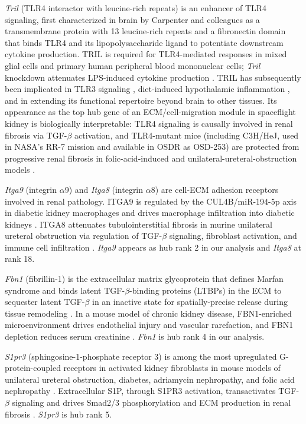 \documentclass[11pt]{article}
\newcommand{\gene}[1]{\textit{#1}}
\begin{document}
\emph{\gene{Tril}} (TLR4 interactor with leucine-rich repeats) is an enhancer of TLR4 signaling, first characterized in brain by Carpenter and colleagues \citep{carpenter2009tril} as a transmembrane protein with 13 leucine-rich repeats and a fibronectin domain that binds TLR4 and its lipopolysaccharide ligand to potentiate downstream cytokine production. TRIL is required for TLR4-mediated responses in mixed glial cells and primary human peripheral blood mononuclear cells; \gene{Tril} knockdown attenuates LPS-induced cytokine production \citep{carpenter2009tril, wochal2014tril}. TRIL has subsequently been implicated in TLR3 signaling \citep{wochal2011tlr3}, diet-induced hypothalamic inflammation \citep{liu2021tril}, and in extending its functional repertoire beyond brain to other tissues. Its appearance as the top hub gene of an ECM/cell-migration module in spaceflight kidney is biologically interpretable: TLR4 signaling is causally involved in renal fibrosis via TGF-$\beta$ activation, and TLR4-mutant mice (including C3H/HeJ, used in NASA's RR-7 mission and available in OSDR as OSD-253) are protected from progressive renal fibrosis in folic-acid-induced and unilateral-ureteral-obstruction models \citep{souza2015tlr4, pulskens2010tlr4}.

\emph{\gene{Itga9}} (integrin $\alpha$9) and \emph{\gene{Itga8}} (integrin $\alpha$8) are cell-ECM adhesion receptors involved in renal pathology. ITGA9 is regulated by the CUL4B/miR-194-5p axis in diabetic kidney macrophages and drives macrophage infiltration into diabetic kidneys \citep{chen2023cul4b}. ITGA8 attenuates tubulointerstitial fibrosis in murine unilateral ureteral obstruction via regulation of TGF-$\beta$ signaling, fibroblast activation, and immune cell infiltration \citep{marek2016itga8}. \emph{\gene{Itga9}} appears as hub rank 2 in our analysis and \emph{\gene{Itga8}} at rank 18.

\emph{\gene{Fbn1}} (fibrillin-1) is the extracellular matrix glycoprotein that defines Marfan syndrome and binds latent TGF-$\beta$-binding proteins (LTBPs) in the ECM to sequester latent TGF-$\beta$ in an inactive state for spatially-precise release during tissue remodeling \citep{ramirez2017fibrillin}. In a mouse model of chronic kidney disease, FBN1-enriched microenvironment drives endothelial injury and vascular rarefaction, and FBN1 depletion reduces serum creatinine \citep{charbonneau2020fibrillin}. \emph{\gene{Fbn1}} is hub rank 4 in our analysis.

\emph{\gene{S1pr3}} (sphingosine-1-phosphate receptor 3) is among the most upregulated G-protein-coupled receptors in activated kidney fibroblasts in mouse models of unilateral ureteral obstruction, diabetes, adriamycin nephropathy, and folic acid nephropathy \citep{shiohira2013s1p, mizugishi2024s1p}. Extracellular S1P, through S1PR3 activation, transactivates TGF-$\beta$ signaling and drives Smad2/3 phosphorylation and ECM production in renal fibrosis \citep{schwalm2017sphingosine}. \emph{\gene{S1pr3}} is hub rank 5.
\end{document}
